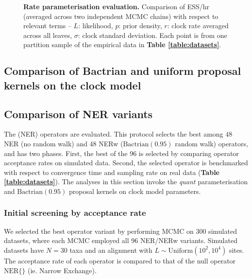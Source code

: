 \documentclass[10pt,letterpaper]{article}
\begin{document}
\begin{figure}[!h]
\caption{\textbf{Rate parameterisation evaluation.} Comparison of ESS/hr (averaged across two independent MCMC chains) with respect to relevant terms -- $L$: likelihood, $p$: prior density, $r$: clock rate averaged across all leaves, $\sigma$: clock standard deviation. Each point is from one partition sample of the empirical data in \textbf{Table \ref{table:datasets}}.  }
\label{fig:parameterisationResults}
\end{figure}







\subsection*{Comparison of Bactrian and uniform proposal kernels on the clock model}



\subsection*{Comparison of NER variants}

The \textbf{} (NER) operators are evaluated. This protocol selects the best among 48 NER (no random walk) and 48 NERw ($\text{Bactrian}(0.95)$ random walk) operators, and has two phases. First, the best of the 96 is selected by comparing operator acceptance rates on simulated data. Second, the selected operator is benchmarked with respect to convergence time and sampling rate on real data (\textbf{Table \ref{table:datasets}}). The analyses in this section invoke the \textit{quant} parameterisation and $\text{Bactrian}(0.95)$ proposal kernels on clock model parameters.




\subsubsection*{Initial screening by acceptance rate}


We selected the best operator variant by performing MCMC on 300 simulated datasets, where each MCMC employed all 96 NER/NERw variants. Simulated datasets have $N=30$ taxa and an alignment with $L \sim \text{Uniform}(10^2, 10^4)$ sites. The acceptance rate of each operator is compared to that of the null operator $\text{NER}\{\}$ (ie. Narrow Exchange). 
\end{document}
